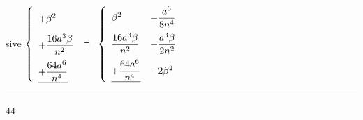                         sive  \protect {}
                      $  \left\{\begin{array}{ll}\displaystyle+\beta^2&\rule[-12.5pt]{0pt}{29.5pt}\\\vspace{0.2cm}\displaystyle+\frac{16a^3\beta}{n^2}&\sqcap\\\underline{\displaystyle+\frac{64a^6}{n^4}}&\end{array}\right.\left\{\begin{array}{ll}\displaystyle\beta^2&\displaystyle-\frac{a^6}{8n^4}\vspace{0.2cm}\\\displaystyle\frac{16a^3\beta}{n^2}&\displaystyle-\frac{a^3\beta}{2n^2}\vspace{0.2cm}\\\underline{\displaystyle+\frac{64a^6}{n^4}}&-2\beta^2\end{array}\right.$
                       \\ \rule[0cm]{4cm}{0cm}4\hspace{2.5cm}4\\
